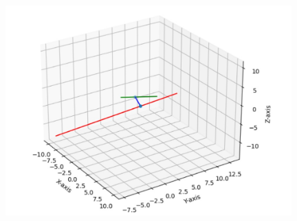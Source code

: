 \documentclass[journal,12pt,twocolumn]{IEEEtran}
\begin{document}
\begin{center}
    \includegraphics[width=11cm]{assignment2.jpg}
\end{center}
\end{document}
